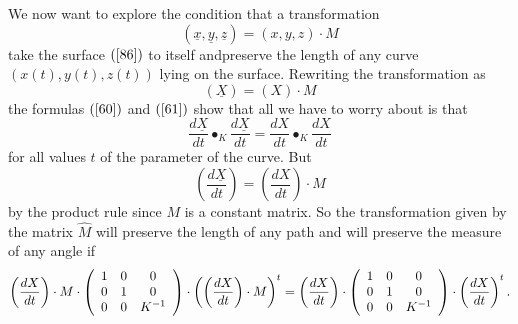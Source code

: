 \documentclass{article}%
\begin{document}
We now want to explore the condition that a transformation%
\[
\left(  \underline{x},\underline{y},\underline{z}\right)  =\left(
x,y,z\right)  \cdot M
\]
take the surface $\left(  \ref{86}\right)  $ to itself andpreserve the length
of any curve $\left(  x\left(  t\right)  ,y\left(  t\right)  ,z\left(
t\right)  \right)  $ lying on the surface. Rewriting the transformation as%
\[
\left(  \underline{X}\right)  =\left(  X\right)  \cdot M
\]
the formulas $\left(  \ref{60}\right)  $ and $\left(  \ref{61}\right)  $ show
that all we have to worry about is that%
\[
\frac{d\underline{X}}{dt}\bullet_{K}\frac{d\underline{X}}{dt}=\frac{dX}%
{dt}\bullet_{K}\frac{dX}{dt}%
\]
for all values $t$ of the parameter of the curve. But%
\[
\left(  \frac{d\underline{X}}{dt}\right)  =\left(  \frac{dX}{dt}\right)  \cdot
M
\]
by the product rule since $M$ is a constant matrix. So the transformation
given by the matrix $\hat{M}$ will preserve the length of any path and will
preserve the measure of any angle if%
\begin{equation}
\left(  \frac{dX}{dt}\right)  \cdot M\cdot\left(
\begin{array}
[c]{ccc}%
1 & 0 & 0\\
0 & 1 & 0\\
0 & 0 & K^{-1}%
\end{array}
\right)  \cdot\left(  \left(  \frac{dX}{dt}\right)  \cdot M\right)
^{t}=\left(  \frac{dX}{dt}\right)  \cdot\left(
\begin{array}
[c]{ccc}%
1 & 0 & 0\\
0 & 1 & 0\\
0 & 0 & K^{-1}%
\end{array}
\right)  \cdot\left(  \frac{dX}{dt}\right)  ^{t}. \label{89}%
\end{equation}
\end{document}
